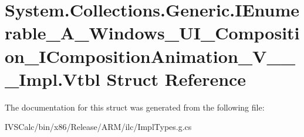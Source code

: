 \hypertarget{struct_system_1_1_collections_1_1_generic_1_1_i_enumerable___a___windows___u_i___composition___id415e36760e4822b11e39af96f214324}{}\section{System.\+Collections.\+Generic.\+I\+Enumerable\+\_\+\+A\+\_\+\+Windows\+\_\+\+U\+I\+\_\+\+Composition\+\_\+\+I\+Composition\+Animation\+\_\+\+V\+\_\+\+\_\+\+\_\+\+Impl.\+Vtbl Struct Reference}
\label{struct_system_1_1_collections_1_1_generic_1_1_i_enumerable___a___windows___u_i___composition___id415e36760e4822b11e39af96f214324}


The documentation for this struct was generated from the following file\+:\begin{DoxyCompactItemize}
\item 
I\+V\+S\+Calc/bin/x86/\+Release/\+A\+R\+M/ilc/Impl\+Types.\+g.\+cs\end{DoxyCompactItemize}
